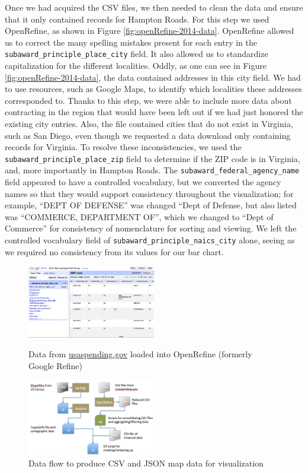 \documentclass[10pt,journal,compsoc]{IEEEtran}
\begin{document}
Once we had acquired the CSV files, we then needed to clean the data and ensure that it only contained records for Hampton Roads.  For this step we used OpenRefine, as shown in Figure \ref{fig:openRefine-2014-data}.  OpenRefine allowed us to correct the many spelling mistakes present for each entry in the {\tt subaward\_principle\_place\_city} field.  It also allowed us to standardize capitalization for the different localities.  Oddly, as one can see in Figure \ref{fig:openRefine-2014-data}, the data contained addresses in this city field.  We had to use resources, such as Google Maps, to identify which localities these addresses corresponded to.  Thanks to this step, we were able to include more data about contracting in the region that would have been left out if we had just honored the existing city entries.  Also, the file contained cities that do not exist in Virginia, such as San Diego, even though we requested a data download only containing records for Virginia.  To resolve these inconsistencies, we used the {\tt subaward\_principle\_place\_zip} field to determine if the ZIP code is in Virginia, and, more importantly in Hampton Roads.  The {\tt subaward\_federal\_agency\_name} field appeared to have a controlled vocabulary, but we converted the agency names so that they would support consistency throughout the visualization; for example, ``DEPT OF DEFENSE'' was changed ``Dept of Defense, but also listed was ``COMMERCE, DEPARTMENT OF'', which we changed to ``Dept of Commerce'' for consistency of nomenclature for sorting and viewing.  We left the controlled vocabulary field of {\tt subaward\_principle\_naics\_city} alone, seeing as we required no consistency from its values for our bar chart.

\begin{figure}[htbp]
	\centering
	\includegraphics[width=0.5\textwidth]{images/openRefine-2014-data.png}
	\caption{Data from \protect\url{usaspending.gov} loaded into OpenRefine (formerly Google Refine)}
	\label{fig:openRefine-2014-data}	

	\vspace{3em}

	\centering
	\includegraphics[width=0.5\textwidth]{images/data-flow.png}
	\caption{Data flow to produce CSV and JSON map data for visualization}
	\label{fig:data-flow}	
\end{figure}
\end{document}
